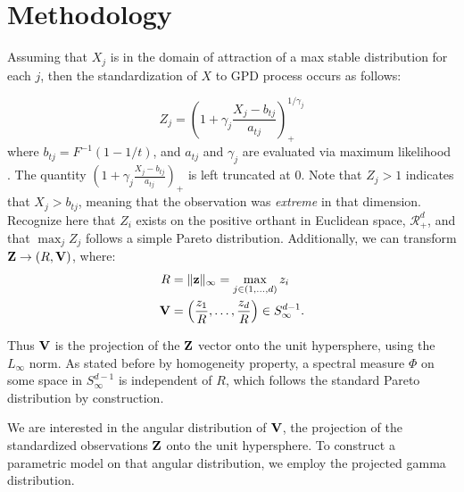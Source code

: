\section{Methodology}
Assuming that $X_j$ is in the domain of attraction of a max stable distribution
  for each $j$, then the standardization of $X$ to GPD process occurs as follows:

\begin{equation}
Z_{j} = \left(1 + \gamma_j\frac{X_{j} - b_{tj}}{a_{tj}}\right)_{+}^{1/\gamma_j}
\end{equation}
where $b_{tj} = F^{-1}(1-1/t)$, and $a_{tj}$ and $\gamma_{j}$ are evaluated via
  maximum likelihood .  The quantity
  $\left(1 + \gamma_j\frac{X_{j} - b_{tj}}{a_{tj}}\right)_+$ is left truncated
  at 0.  Note that $Z_j > 1$ indicates that $X_{j} > b_{tj}$, meaning that the
  observation was \emph{extreme} in that dimension.  Recognize here that $Z_i$
  exists on the positive orthant in Euclidean space, $\mathcal{R}_+^d$, and
  that $\max_jZ_j$ follows a simple Pareto distribution.  Additionally, we can
  transform ${\bf Z} \rightarrow (R, {\bf V})$, where:
\begin{equation}
  \begin{aligned}
    R &= \lVert {\bf z} \rVert_{\infty} = \max_{j \in (1,\ldots,d)} z_i\\
    {\bf V} &= \left(\frac{z_1}{R},\ldots,\frac{z_d}{R}\right) \in S_{\infty}^{d-1}.\\
  \end{aligned}
\end{equation}

Thus ${\bf V}$ is the projection of the ${\bf Z}$ vector onto the unit
  hypersphere, using the $L_{\infty}$ norm.  As stated before by homogeneity
  property, a spectral measure $\Phi$ on some space in $S_{\infty}^{d-1}$ is
  independent of $R$, which follows the standard Pareto distribution by
  construction.

We are interested in the angular distribution of ${\bf V}$, the projection of
  the standardized observations ${\bf Z}$ onto the unit hypersphere. To
  construct a parametric model on that angular distribution, we employ the
  projected gamma distribution.

